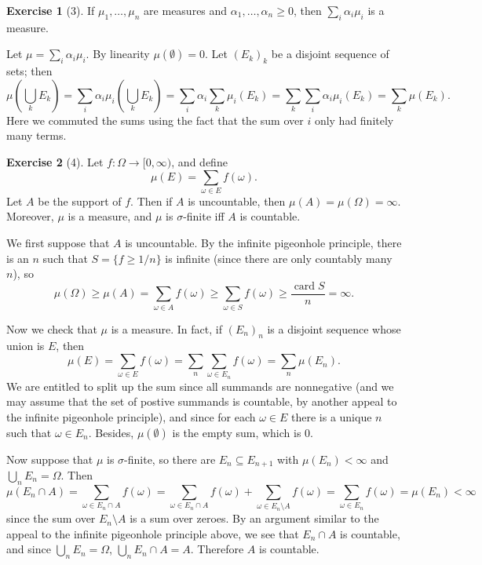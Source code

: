 \documentclass[10pt]{article}
\newcommand{\card}{\operatorname{card}}
\theoremstyle{definition}
\newtheorem{exer}{Exercise}
\begin{document}
\begin{exer}[3]
If $\mu_1, \dots, \mu_n$ are measures and $\alpha_1, \dots, \alpha_n \geq 0$, then $\sum_i \alpha_i \mu_i$ is a measure.
\end{exer}

Let $\mu = \sum_i \alpha_i \mu_i$. By linearity $\mu(\emptyset) = 0$. Let $(E_k)_k$ be a disjoint sequence of sets; then
$$\mu\left(\bigcup_k E_k\right) = \sum_i \alpha_i \mu_i\left(\bigcup_k E_k\right) = \sum_i \alpha_i \sum_k \mu_i(E_k) = \sum_k \sum_i \alpha_i \mu_i(E_k) = \sum_k \mu(E_k).$$
Here we commuted the sums using the fact that the sum over $i$ only had finitely many terms.

\begin{exer}[4]
Let $f: \Omega \to [0, \infty)$, and define
$$\mu(E) = \sum_{\omega \in E} f(\omega).$$
Let $A$ be the support of $f$. Then if $A$ is uncountable, then $\mu(A) =\mu(\Omega) = \infty$. Moreover, $\mu$ is a measure, and $\mu$ is $\sigma$-finite iff $A$ is countable.
\end{exer}

We first suppose that $A$ is uncountable. By the infinite pigeonhole principle, there is an $n$ such that $S = \{f \geq 1/n\}$ is infinite (since there are only countably many $n$), so
$$\mu(\Omega) \geq \mu(A) = \sum_{\omega \in A} f(\omega) \geq \sum_{\omega \in S} f(\omega) \geq \frac{\card S}{n} = \infty.$$

Now we check that $\mu$ is a measure. In fact, if $(E_n)_n$ is a disjoint sequence whose union is $E$, then
$$\mu(E) = \sum_{\omega \in E} f(\omega) = \sum_n \sum_{\omega \in E_n} f(\omega) = \sum_n \mu(E_n).$$
We are entitled to split up the sum since all summands are nonnegative (and we may assume that the set of postive summands is countable, by another appeal to the infinite pigeonhole principle), and since for each $\omega \in E$ there is a unique $n$ such that $\omega \in E_n$. Besides, $\mu(\emptyset)$ is the empty sum, which is $0$.

Now suppose that $\mu$ is $\sigma$-finite, so there are $E_n \subseteq E_{n+1}$ with $\mu(E_n) < \infty$ and $\bigcup_n E_n = \Omega$.
Then
$$\mu(E_n \cap A) = \sum_{\omega \in E_n \cap A} f(\omega) = \sum_{\omega \in E_n \cap A} f(\omega) + \sum_{\omega \in E_n \setminus A} f(\omega) = \sum_{\omega \in E_n} f(\omega) = \mu(E_n) < \infty$$
since the sum over $E_n \setminus A$ is a sum over zeroes.
By an argument similar to the appeal to the infinite pigeonhole principle above, we see that $E_n \cap A$ is countable, and since $\bigcup_n E_n = \Omega$, $\bigcup_n E_n \cap A = A$.
Therefore $A$ is countable.
\end{document}
